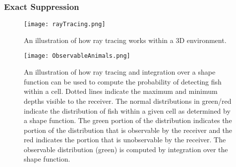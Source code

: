 \subsubsection{Exact Suppression}



\begin{figure}[t]
	\label{rayTracing}
	\centering
	\texttt{[image: rayTracing.png]}
	\caption{An illustration of how ray tracing works within a 3D environment. \cite{Akbarzadeh2013}}
\end{figure}

\begin{figure}[t]
	\label{observableAnimals}
	\centering
	\texttt{[image: ObservableAnimals.png]}
	\caption{An illustration of how ray tracing and integration over a shape function can be used to compute the probability of detecting fish within a cell.  Dotted lines indicate the maximum and minimum depths visible to the receiver.  The normal distributions in green/red indicate the distribution of fish within a given cell as determined by a shape function.  The green portion of the distribution indicates the portion of the distribution that is observable by the receiver and the red indicates the portion that is unobservable by the receiver.  The observable distribution (green) is computed by integration over the shape function.}
\end{figure}